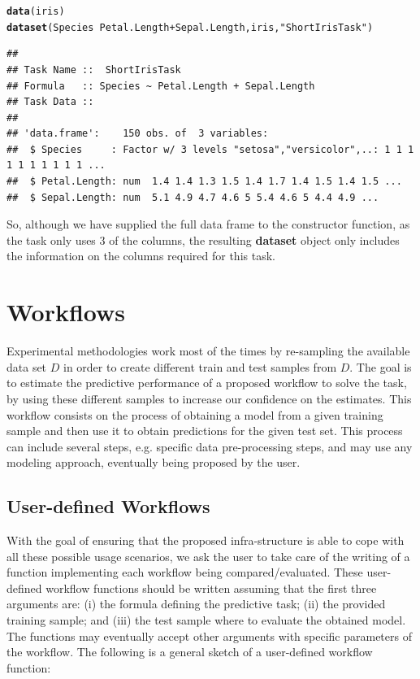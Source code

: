 \documentclass[10pt,a4paper]{article}\usepackage[]{graphicx}\usepackage[]{color}
\makeatletter
\newcommand{\hlstr}[1]{\textcolor[rgb]{0.192,0.494,0.8}{#1}}%
\newcommand{\hlopt}[1]{\textcolor[rgb]{0,0,0}{#1}}%
\newcommand{\hlstd}[1]{\textcolor[rgb]{0.345,0.345,0.345}{#1}}%
\newcommand{\hlkwd}[1]{\textcolor[rgb]{0.737,0.353,0.396}{\textbf{#1}}}%
\newenvironment{kframe}{%
 \def\at@end@of@kframe{}%
 \ifinner\ifhmode%
  \def\at@end@of@kframe{\end{minipage}}%
  \begin{minipage}{\columnwidth}%
 \fi\fi%
 \def\FrameCommand##1{\hskip\@totalleftmargin \hskip-\fboxsep
 \colorbox{shadecolor}{##1}\hskip-\fboxsep
     \hskip-\linewidth \hskip-\@totalleftmargin \hskip\columnwidth}%
 \MakeFramed {\advance\hsize-\width
   \@totalleftmargin\z@ \linewidth\hsize
   \@setminipage}}%
 {\par\unskip\endMakeFramed%
 \at@end@of@kframe}
\newenvironment{knitrout}{}{} %
\makeatother
\begin{document}
\begin{knitrout}
\color{fgcolor}\begin{kframe}
\begin{alltt}
\hlkwd{data}\hlstd{(iris)}
\hlkwd{dataset}\hlstd{(Species} \hlopt{~} \hlstd{Petal.Length} \hlopt{+} \hlstd{Sepal.Length, iris,} \hlstr{"ShortIrisTask"}\hlstd{)}
\end{alltt}
\begin{verbatim}
## 
## Task Name ::  ShortIrisTask
## Formula   :: Species ~ Petal.Length + Sepal.Length
## Task Data ::
## 
## 'data.frame':	150 obs. of  3 variables:
##  $ Species     : Factor w/ 3 levels "setosa","versicolor",..: 1 1 1 1 1 1 1 1 1 1 ...
##  $ Petal.Length: num  1.4 1.4 1.3 1.5 1.4 1.7 1.4 1.5 1.4 1.5 ...
##  $ Sepal.Length: num  5.1 4.9 4.7 4.6 5 5.4 4.6 5 4.4 4.9 ...
\end{verbatim}
\end{kframe}
\end{knitrout}


So, although we have supplied the full data frame to the constructor
function, as the task only uses 3 of the columns, the resulting
\textbf{dataset} object only includes the information on the columns
required for this task.

\section{Workflows}

Experimental methodologies work most of the times by re-sampling the
available data set $D$ in order to create different train and test
samples from $D$. The goal is to estimate the predictive performance
of a proposed workflow to solve the task, by using these different
samples to increase our confidence on the estimates. This workflow
consists on the process of obtaining a model from a given training
sample and then use it to obtain predictions for the given test
set. This process can include several steps, e.g. specific data
pre-processing steps, and may use any modeling approach, eventually
being proposed by the user. 

\subsection{User-defined Workflows}

With the goal of ensuring that the
proposed infra-structure is able to cope with all these possible usage
scenarios, we ask the user to take care of the writing of a function
implementing each workflow being compared/evaluated. These
user-defined workflow functions should be written assuming that the
first three arguments are: (i) the formula defining the predictive
task; (ii) the provided training sample; and (iii) the test sample
where to evaluate the obtained model. The functions may eventually
accept other arguments with specific parameters of the workflow. The
following is a general sketch of a user-defined workflow function:
\end{document}
